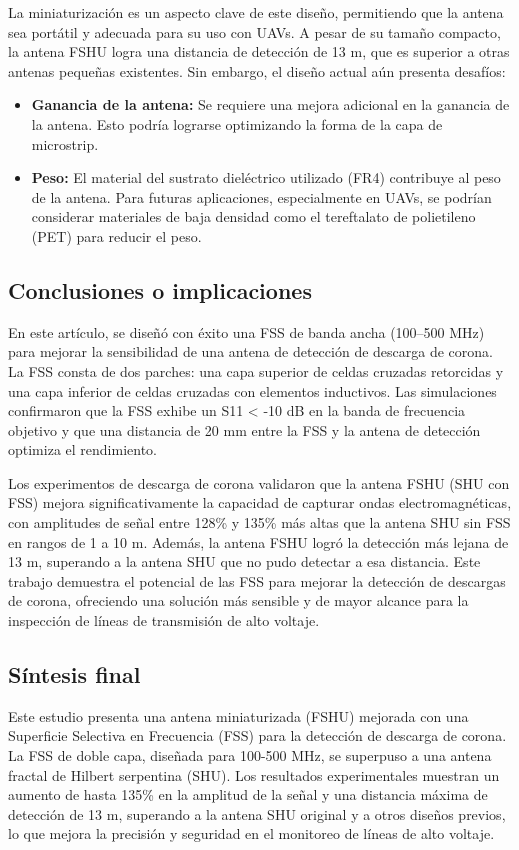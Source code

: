 La miniaturización es un aspecto clave de este diseño, permitiendo que la antena sea portátil y adecuada para su uso con UAVs. A pesar de su tamaño compacto, la antena FSHU logra una distancia de detección de 13 m, que es superior a otras antenas pequeñas existentes. Sin embargo, el diseño actual aún presenta desafíos:
\begin{itemize}
    \item \textbf{Ganancia de la antena:} Se requiere una mejora adicional en la ganancia de la antena. Esto podría lograrse optimizando la forma de la capa de microstrip.
    \item \textbf{Peso:} El material del sustrato dieléctrico utilizado (FR4) contribuye al peso de la antena. Para futuras aplicaciones, especialmente en UAVs, se podrían considerar materiales de baja densidad como el tereftalato de polietileno (PET) para reducir el peso.
\end{itemize}

\subsection*{Conclusiones o implicaciones}

En este artículo, se diseñó con éxito una FSS de banda ancha (100–500 MHz) para mejorar la sensibilidad de una antena de detección de descarga de corona. La FSS consta de dos parches: una capa superior de celdas cruzadas retorcidas y una capa inferior de celdas cruzadas con elementos inductivos. Las simulaciones confirmaron que la FSS exhibe un S11 < -10 dB en la banda de frecuencia objetivo y que una distancia de 20 mm entre la FSS y la antena de detección optimiza el rendimiento.

Los experimentos de descarga de corona validaron que la antena FSHU (SHU con FSS) mejora significativamente la capacidad de capturar ondas electromagnéticas, con amplitudes de señal entre 128\% y 135\% más altas que la antena SHU sin FSS en rangos de 1 a 10 m. Además, la antena FSHU logró la detección más lejana de 13 m, superando a la antena SHU que no pudo detectar a esa distancia. Este trabajo demuestra el potencial de las FSS para mejorar la detección de descargas de corona, ofreciendo una solución más sensible y de mayor alcance para la inspección de líneas de transmisión de alto voltaje.

\subsection*{Síntesis final}
Este estudio presenta una antena miniaturizada (FSHU) mejorada con una Superficie Selectiva en Frecuencia (FSS) para la detección de descarga de corona. La FSS de doble capa, diseñada para 100-500 MHz, se superpuso a una antena fractal de Hilbert serpentina (SHU). Los resultados experimentales muestran un aumento de hasta 135\% en la amplitud de la señal y una distancia máxima de detección de 13 m, superando a la antena SHU original y a otros diseños previos, lo que mejora la precisión y seguridad en el monitoreo de líneas de alto voltaje.
